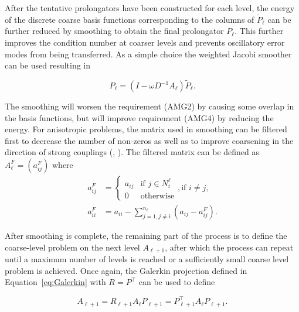 After the tentative prolongators have been constructed for each level, the energy of the discrete coarse basis functions corresponding to the columns of $\tilde{P}_\ell$ can be further reduced by smoothing to obtain the final prolongator $P_\ell$. This further improves the condition number at coarser levels and prevents oscillatory error modes from being transferred. As a simple choice the weighted Jacobi smoother can be used resulting in

\begin{equation}
	\label{eq:P_smoothing}
	P_\ell = (I - \omega D^{-1}A_\ell)\tilde{P}_\ell.
\end{equation}

The smoothing will worsen the requirement (AMG2) by causing some overlap in the basis functions, but will improve requirement (AMG4) by reducing the energy. For anisotropic problems, the matrix used in smoothing can be filtered first to decrease the number of non-zeros as well as to improve coarsening in the direction of strong couplings (\cite{Gee2009}, \cite{Vanek1996}). The filtered matrix can be defined as $A_\ell^F = \left(a_{ij}^F\right)$ where
\begin{equation}
	\begin{aligned}
	a_{ij}^F &=
	\begin{cases}
		a_{ij} & \text{if $j \in N_i^\ell$} \\
		0 & \text{otherwise}
	\end{cases}, \text{if $i \neq j$}, \\
	a_{ii}^F & =  a_{ii} - \displaystyle \sum_{j=1, j\neq i}^{n_\ell}{\left(a_{ij} - a_{ij}^F\right)}.
	\end{aligned}
\end{equation}

After smoothing is complete, the remaining part of the process is to define the coarse-level problem on the next level $A_{\ell+1}$, after which the process can repeat until a maximum number of levels is reached or a sufficiently small coarse level problem is achieved. Once again, the Galerkin projection defined in Equation~\ref{eq:Galerkin} with $R = P^\top$ can be used to define

\begin{equation}
	A_{\ell+1} = R_{\ell+1} A_\ell P_{\ell+1} = P_{\ell+1}^\top A_\ell P_{\ell+1}.
\end{equation}


